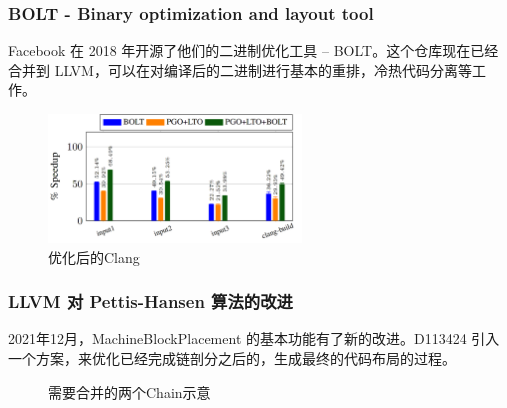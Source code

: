 \begin{frame}
    \frametitle{BOLT - Binary optimization and layout tool}

    Facebook 在 2018 年开源了他们的二进制优化工具 -- BOLT\cite{facebook2018bolt}\cite{panchenko2019bolt}。这个仓库现在已经合并到 LLVM，可以在对编译后的二进制进行基本的重排，冷热代码分离等工作。

    \begin{figure}
        \centering
        \includegraphics[width=0.6\textwidth]{images/perf_improv_clang.png}
        \caption{优化后的Clang}
    \end{figure}

\end{frame}


\begin{frame}
    \frametitle{LLVM 对 Pettis-Hansen 算法的改进}

    2021年12月，MachineBlockPlacement 的基本功能有了新的改进。D113424\cite{llvmexttspbbl2021} 引入一个方案，来优化已经完成链剖分之后的，生成最终的代码布局的过程。

    \begin{figure}
        
        \caption{需要合并的两个Chain示意}
    \end{figure}

\end{frame}